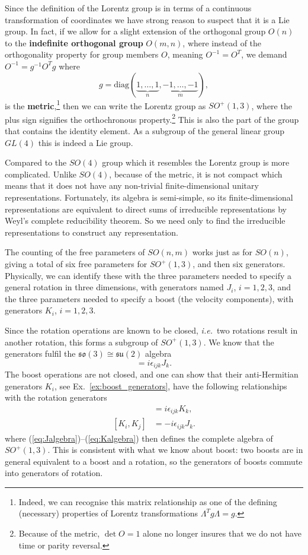 \documentclass[notes.tex]{subfiles}
\begin{document}
Since the definition of the Lorentz group is in terms of a continuous transformation of coordinates we have strong reason to suspect that it is a Lie group. In fact, if we allow for a slight extension of the orthogonal group $O(n)$ to the {\bf indefinite orthogonal group} $O(m,n)$, where instead of the orthogonality property for group members $O$, meaning $O^{-1}=O^T$, we demand $O^{-1}=g^{-1}O^Tg$ where
\[g=\text{diag}(\underbrace{1,\ldots,1}_n,\underbrace{-1,\ldots,-1}_m),\] is the {\bf metric},\footnote{Indeed, we can recognise this matrix relationship as one of the defining (necessary) properties of Lorentz transformations $\Lambda^Tg\Lambda=g$.} then we can write the Lorentz group as $SO^+(1,3)$, where the plus sign signifies the orthochronous property.\footnote{Because of the metric, $\det O=1$ alone no longer insures that we do not have time or parity reversal.} This is also the part of the group that contains the identity element. As a subgroup of the general linear group $GL(4)$ this is indeed a Lie group.

Compared to the $SO(4)$ group which it resembles the Lorentz group is more complicated. Unlike $SO(4)$, because of the metric, it is not compact which means that it does not have any non-trivial finite-dimensional unitary representations. Fortunately, its algebra is semi-simple, so its finite-dimensional representations are equivalent to direct sums of irreducible representations by Weyl’s complete reducibility theorem. So we need only to find the irreducible representations to construct any representation.

The counting of the free parameters of $SO(n,m)$ works just as for $SO(n)$, giving a total of six free parameters for  $SO^+(1,3)$, and then six generators. Physically, we can identify these with the three parameters needed to specify a general rotation in three dimensions, with generators named $J_i$, $i=1,2,3$, and the three parameters needed to specify a boost (the velocity components), with generators $K_i$, $i=1,2,3$.

Since the rotation operations are known to be closed, {\it i.e.}\ two rotations result in another rotation, this forms a subgroup of $SO^+(1,3)$. We know that the generators fulfil the $\mathfrak{so}(3)\cong\mathfrak{su}(2)$ algebra
\begin{equation}
[J_i,J_j]=i\epsilon_{ijk}J_k.\label{eq:Jalgebra}
\end{equation}
The boost operations are not closed, and one can show that their anti-Hermitian generators $K_i$, see Ex.~\ref{ex:boost_generators}, have the following relationships with the rotation generators
\begin{align}
[K_i,J_j] &= i \epsilon_{ijk}K_k, \label{eq:KJalgebra} \\
[K_i,K_j] &= -i\epsilon_{ijk}J_k. \label{eq:Kalgebra}
\end{align}
where (\ref{eq:Jalgebra})--(\ref{eq:Kalgebra}) then defines the complete algebra of $SO^+(1,3)$. This is consistent with what we know about boost: two boosts are in general equivalent to a boost and a rotation, so the generators of boosts commute into generators of rotation.
\end{document}
